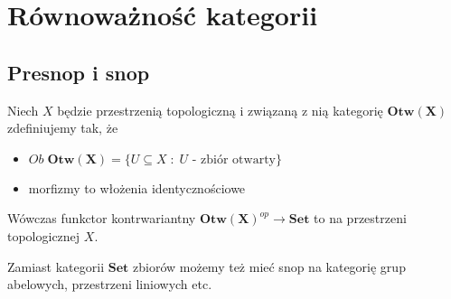 \section{Równoważność kategorii}

\subsection{Presnop i snop}

\begin{definition}[Presnop]
  Niech $X$ będzie przestrzenią topologiczną i związaną z nią kategorię $\mathbf{Otw(X)}$ zdefiniujemy tak, że
  \begin{itemize}
    \item $Ob\;\mathbf{Otw(X)}=\{U\subseteq X\;:\;U\text{ - zbiór otwarty}\}$
    \item morfizmy to włożenia identycznościowe
  \end{itemize}
  Wówczas funkctor kontrwariantny $\mathbf{Otw(X)}^{op}\to \mathbf{Set}$ to  na przestrzeni topologicznej $X$.
\end{definition}

Zamiast kategorii $\mathbf{Set}$ zbiorów możemy też mieć snop na kategorię grup abelowych, przestrzeni liniowych etc.
